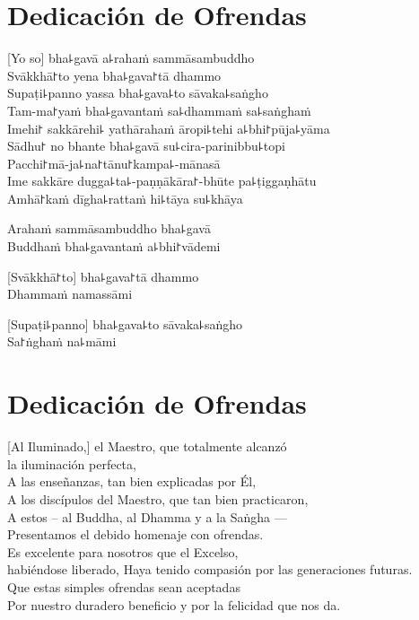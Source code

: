 \chapter*{Dedicación de Ofrendas}

\delegateSetUseNext

[Yo so] bha꜕gavā a꜕rahaṁ sammāsambuddho\\
Svākkhā꜓to yena bha꜕gava꜓tā dhammo\\
Supaṭi꜕panno yassa bha꜕gava꜕to sāvaka꜕saṅgho\\
Tam-ma꜓yaṁ bha꜕gavantaṁ sa꜕dhammaṁ sa꜕saṅghaṁ\\
Imehi꜓ sakkārehi꜕ yathārahaṁ āropi꜕tehi a꜕bhi꜓pūja꜕yāma\\
Sādhu꜓ no bhante bha꜕gavā su꜕cira-parinibbu꜕topi\\
Pacchi꜓mā-ja꜕na꜓tānu꜓kampa꜕-mānasā\\
Ime sakkāre dugga꜕ta꜕-paṇṇākāra꜓-bhūte pa꜕ṭiggaṇhātu\\
Amhā꜓kaṁ dīgha꜕rattaṁ hi꜕tāya su꜕khāya

Arahaṁ sammāsambuddho bha꜕gavā\\
Buddhaṁ bha꜕gavantaṁ a꜕bhi꜓vādemi 

[Svākkhā꜓to] bha꜕gava꜓tā dhammo\\
Dhammaṁ namassāmi 

[Supaṭi꜕panno] bha꜕gava꜕to sāvaka꜕saṅgho\\
Sa꜓ṅghaṁ na꜕māmi 

\clearpage

\chapter{Dedicación de Ofrendas}

[Al Iluminado,] el Maestro, que totalmente alcanzó\\
\vin la iluminación perfecta,\\
A las enseñanzas, tan bien explicadas por Él,\\
A los discípulos del Maestro, que tan bien practicaron,\\
A estos – al Buddha, al Dhamma y a la Saṅgha ---\\
Presentamos el debido homenaje con ofrendas.\\
Es excelente para nosotros que el Excelso,\\
\vin habiéndose liberado,
Haya tenido compasión por las generaciones futuras.\\
Que estas simples ofrendas sean aceptadas\\
Por nuestro duradero beneficio y por la felicidad que nos da.

